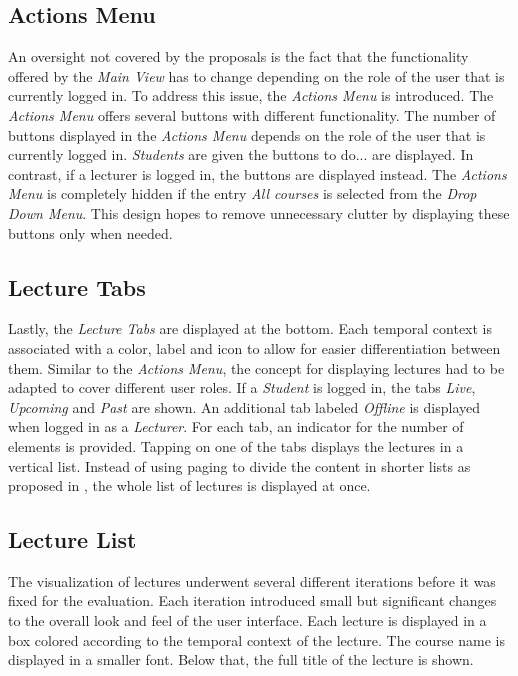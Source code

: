 \subsection{Actions Menu}
An oversight not covered by the proposals is the fact that the functionality offered by the \emph{Main View} has to change depending on the role of the user that is currently logged in. To address this issue, the \emph{Actions Menu} is introduced.
The \emph{Actions Menu} offers several buttons with different functionality.
The number of buttons displayed in the \emph{Actions Menu} depends on the role of the user that is currently logged in. \emph{Students} are given the buttons to do... \todosct are displayed. In contrast, if a lecturer is logged in, the buttons \todoedit are displayed instead.
The \emph{Actions Menu} is completely hidden if the entry \emph{All courses} is selected from the \emph{Drop Down Menu}. This design hopes to remove unnecessary clutter by displaying these buttons only when needed.
\subsection{Lecture Tabs}
Lastly, the \emph{Lecture Tabs} are displayed at the bottom. Each temporal context is associated with a color, label and icon to allow for easier differentiation between them. Similar to the \emph{Actions Menu}, the concept for displaying lectures had to be adapted to cover different user roles.
If a \emph{Student} is logged in, the tabs \emph{Live}, \emph{Upcoming} and \emph{Past} are shown. An additional tab labeled \emph{Offline} is displayed when logged in as a \emph{Lecturer}.
For each tab, an indicator for the number of elements is provided.
Tapping on one of the tabs displays the lectures in a vertical list. Instead of using paging to divide the content in shorter lists as proposed in , the whole list of lectures is displayed at once.

\subsection{Lecture List}
The visualization of lectures underwent several different iterations before it was fixed for the evaluation. Each iteration introduced small but significant changes to the overall look and feel of the user interface.
Each lecture is displayed in a box colored according to the temporal context of the lecture. The course name is displayed in a smaller font. Below that, the full title of the lecture is shown.

